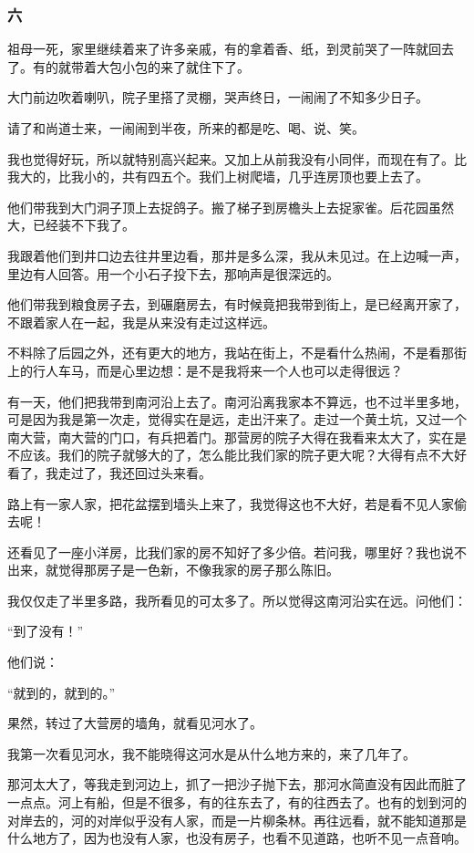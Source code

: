 \subsubsection*{六}
\par 祖母一死，家里继续着来了许多亲戚，有的拿着香、纸，到灵前哭了一阵就回去了。有的就带着大包小包的来了就住下了。
\par 大门前边吹着喇叭，院子里搭了灵棚，哭声终日，一闹闹了不知多少日子。
\par 请了和尚道士来，一闹闹到半夜，所来的都是吃、喝、说、笑。
\par 我也觉得好玩，所以就特别高兴起来。又加上从前我没有小同伴，而现在有了。比我大的，比我小的，共有四五个。我们上树爬墙，几乎连房顶也要上去了。
\par 他们带我到大门洞子顶上去捉鸽子。搬了梯子到房檐头上去捉家雀。后花园虽然大，已经装不下我了。
\par 我跟着他们到井口边去往井里边看，那井是多么深，我从未见过。在上边喊一声，里边有人回答。用一个小石子投下去，那响声是很深远的。
\par 他们带我到粮食房子去，到碾磨房去，有时候竟把我带到街上，是已经离开家了，不跟着家人在一起，我是从来没有走过这样远。
\par 不料除了后园之外，还有更大的地方，我站在街上，不是看什么热闹，不是看那街上的行人车马，而是心里边想：是不是我将来一个人也可以走得很远？
\par 有一天，他们把我带到南河沿上去了。南河沿离我家本不算远，也不过半里多地，可是因为我是第一次走，觉得实在是远，走出汗来了。走过一个黄土坑，又过一个南大营，南大营的门口，有兵把着门。那营房的院子大得在我看来太大了，实在是不应该。我们的院子就够大的了，怎么能比我们家的院子更大呢？大得有点不大好看了，我走过了，我还回过头来看。
\par 路上有一家人家，把花盆摆到墙头上来了，我觉得这也不大好，若是看不见人家偷去呢！
\par 还看见了一座小洋房，比我们家的房不知好了多少倍。若问我，哪里好？我也说不出来，就觉得那房子是一色新，不像我家的房子那么陈旧。
\par 我仅仅走了半里多路，我所看见的可太多了。所以觉得这南河沿实在远。问他们：
\par “到了没有！”
\par 他们说：
\par “就到的，就到的。”
\par 果然，转过了大营房的墙角，就看见河水了。
\par 我第一次看见河水，我不能晓得这河水是从什么地方来的，来了几年了。
\par 那河太大了，等我走到河边上，抓了一把沙子抛下去，那河水简直没有因此而脏了一点点。河上有船，但是不很多，有的往东去了，有的往西去了。也有的划到河的对岸去的，河的对岸似乎没有人家，而是一片柳条林。再往远看，就不能知道那是什么地方了，因为也没有人家，也没有房子，也看不见道路，也听不见一点音响。
